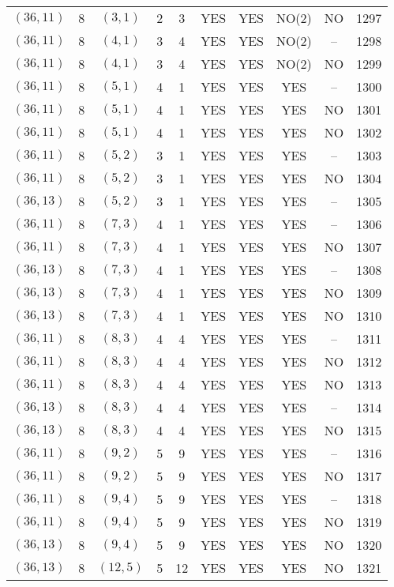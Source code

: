 \begin{longtable}{|c|c|c|c|c|c|c|c|c|c|}
$(36, 11)$ & 8 & $(3, 1)$ & 2 & 3 & YES & YES & NO(2) & NO & 1297\\
$(36, 11)$ & 8 & $(4, 1)$ & 3 & 4 & YES & YES & NO(2) & -- & 1298\\
$(36, 11)$ & 8 & $(4, 1)$ & 3 & 4 & YES & YES & NO(2) & NO & 1299\\
$(36, 11)$ & 8 & $(5, 1)$ & 4 & 1 & YES & YES & YES & -- & 1300\\
$(36, 11)$ & 8 & $(5, 1)$ & 4 & 1 & YES & YES & YES & NO & 1301\\
$(36, 11)$ & 8 & $(5, 1)$ & 4 & 1 & YES & YES & YES & NO & 1302\\
$(36, 11)$ & 8 & $(5, 2)$ & 3 & 1 & YES & YES & YES & -- & 1303\\
$(36, 11)$ & 8 & $(5, 2)$ & 3 & 1 & YES & YES & YES & NO & 1304\\
$(36, 13)$ & 8 & $(5, 2)$ & 3 & 1 & YES & YES & YES & -- & 1305\\
$(36, 11)$ & 8 & $(7, 3)$ & 4 & 1 & YES & YES & YES & -- & 1306\\
$(36, 11)$ & 8 & $(7, 3)$ & 4 & 1 & YES & YES & YES & NO & 1307\\
$(36, 13)$ & 8 & $(7, 3)$ & 4 & 1 & YES & YES & YES & -- & 1308\\
$(36, 13)$ & 8 & $(7, 3)$ & 4 & 1 & YES & YES & YES & NO & 1309\\
$(36, 13)$ & 8 & $(7, 3)$ & 4 & 1 & YES & YES & YES & NO & 1310\\
$(36, 11)$ & 8 & $(8, 3)$ & 4 & 4 & YES & YES & YES & -- & 1311\\
$(36, 11)$ & 8 & $(8, 3)$ & 4 & 4 & YES & YES & YES & NO & 1312\\
$(36, 11)$ & 8 & $(8, 3)$ & 4 & 4 & YES & YES & YES & NO & 1313\\
$(36, 13)$ & 8 & $(8, 3)$ & 4 & 4 & YES & YES & YES & -- & 1314\\
$(36, 13)$ & 8 & $(8, 3)$ & 4 & 4 & YES & YES & YES & NO & 1315\\
$(36, 11)$ & 8 & $(9, 2)$ & 5 & 9 & YES & YES & YES & -- & 1316\\
$(36, 11)$ & 8 & $(9, 2)$ & 5 & 9 & YES & YES & YES & NO & 1317\\
$(36, 11)$ & 8 & $(9, 4)$ & 5 & 9 & YES & YES & YES & -- & 1318\\
$(36, 11)$ & 8 & $(9, 4)$ & 5 & 9 & YES & YES & YES & NO & 1319\\
$(36, 13)$ & 8 & $(9, 4)$ & 5 & 9 & YES & YES & YES & NO & 1320\\
$(36, 13)$ & 8 & $(12, 5)$ & 5 & 12 & YES & YES & YES & NO & 1321\\

\end{longtable}
